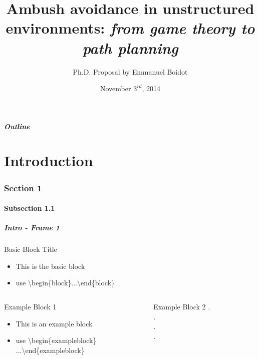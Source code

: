 \documentclass[10pt,compress]{beamer}
\title[Ambush avoidance routing] %
{Ambush avoidance in unstructured environments: \textit{from game theory to path planning}}
\author[E. Boidot]{Ph.D. Proposal by Emmanuel Boidot}
\institute %
{Advisor: Dr. Eric Feron \\ Georgia Institute of Technology\\
  Guggenheim School of Aerospace Engineering}
\date{November $3^{rd}$, 2014} %
\begin{document}
{
\setlength{\headheight}{0in}
\begin{frame}
\titlepage
\end{frame}
}
\addtocounter{framenumber}{-1}

{
\begin{frame}\frametitle{Outline}
  \tableofcontents[onlyparts]
\end{frame} 
}

\part[Intro]{Introduction} 

\section{Section 1}
\subsection{Subsection 1.1}
\begin{frame}\frametitle{Intro - Frame 1} 
\begin{block}{Basic Block Title}
\begin{itemize}
 \item This is the basic block
\item use \textbackslash begin\{block\}...\textbackslash end\{block\}
\end{itemize}
\end{block}
\pause
\begin{columns}
\begin{column}{5cm}
\begin{exampleblock}{Example Block 1}
\begin{itemize}
 \item This is an example block
\item use \textbackslash begin\{exampleblock\}\\ ...\textbackslash end\{exampleblock\}
\end{itemize}
\end{exampleblock}
\pause
\end{column}
\begin{column}{5cm}
\begin{exampleblock}{Example Block 2}
.\\
.\\
.\\
.\\
\end{exampleblock}
\end{column}
\end{columns}
\end{frame}
\end{document}
